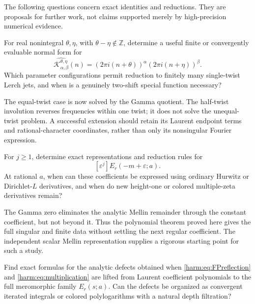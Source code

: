 The following questions concern exact identities and reductions.
They are proposals for further work, not claims supported merely by
high-precision numerical evidence.

\begin{question}
\label{future:q:unequaltwists}
For real nonintegral \(\theta,\eta\), with
\(\theta-\eta\notin\mathbb Z\), determine a useful finite or
convergently evaluable normal form for
\[
 \widehat{\mathcal K_{\alpha,\beta}^{\theta,\eta}}(n)
 =(2\pi i(n+\theta))^\alpha
  (2\pi i(n+\eta))^\beta .
\]
Which parameter configurations permit reduction to finitely many
single-twist Lerch jets, and when is a genuinely two-shift
special function necessary?
\end{question}

The equal-twist case is now solved by the Gamma quotient.
The half-twist involution reverses frequencies within one twist;
it does not solve the unequal-twist problem. A successful extension
should retain its Laurent endpoint terms and rational-character
coordinates, rather than only its nonsingular Fourier expression.

\begin{question}
\label{future:q:regularcoefficients}
For \(j\geq1\), determine exact representations and reduction rules
for
\[
 [\varepsilon^j]E_r(-m+\varepsilon;a).
\]
At rational \(a\), when can these coefficients be expressed using
ordinary Hurwitz or Dirichlet-\(L\) derivatives, and when do new
height-one or colored multiple-zeta derivatives remain?
\end{question}

The Gamma zero eliminates the analytic Mellin remainder through
the constant coefficient, but not beyond it. Thus the polynomial
theorem proved here gives the full singular and finite data without
settling the next regular coefficient. The independent scalar
Mellin representation supplies a rigorous starting point for
such a study.

\begin{question}
\label{future:q:lift}
Find exact formulas for the analytic defects obtained when
\eqref{harm:eq:FPreflection} and \eqref{harm:eq:multiplication}
are lifted from Laurent coefficient polynomials to the full
meromorphic family \(E_r(s;a)\).
Can the defects be organized as convergent iterated integrals or
colored polylogarithms with a natural depth filtration?
\end{question}

